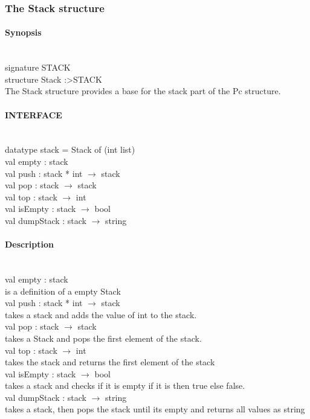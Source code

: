 \documentclass{article}
\begin{document}
\subsubsection{The Stack structure}
\paragraph{Synopsis}\
\\
signature STACK \\
structure Stack :\textgreater STACK
\\
The Stack structure provides a base for the stack part of the Pc structure.

\paragraph{INTERFACE}\
\\
	datatype stack = Stack of (int list)\\	
	val empty : stack \\
	val push : stack * int $\rightarrow$ stack\\					
	val pop : stack $\rightarrow$ stack\\						
	val top : stack $\rightarrow$ int\\						
	val isEmpty : stack $\rightarrow$ bool \\						
	val dumpStack : stack $\rightarrow$ string\\					 
	
\paragraph{Description}\
\\
	val empty : stack\\
		is a definition of a empty Stack
\\
	val push : stack * int $\rightarrow$ stack\\					
		takes a stack and adds the value of int to the stack.
\\
	val pop : stack $\rightarrow$ stack	\\					
		takes a Stack and pops the first element of the stack.
\\
	val top : stack $\rightarrow$ int\\							
		takes the stack and returns the first element of the stack
\\
	val isEmpty : stack $\rightarrow$ bool\\						
		takes a stack and checks if it is empty if it is then true else false.
\\
	val dumpStack : stack $\rightarrow$ string\\
		takes a stack, then pops the stack until its empty and returns all values as string
\end{document}
